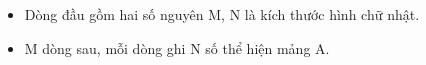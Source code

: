 \begin{itemize}
	\item     Dòng đầu gồm hai số nguyên M, N là kích thước hình chữ nhật.   
	\item     M dòng sau, mỗi dòng ghi N số thể hiện mảng A.   
\end{itemize}